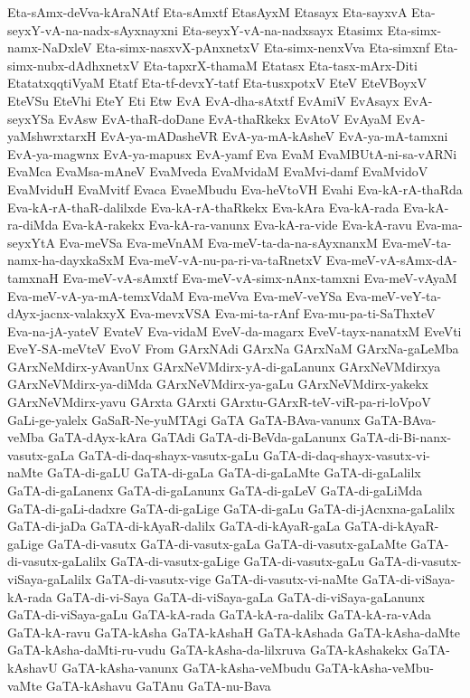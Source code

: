 {Eta-sAmx-deVva-kAraNAtf
Eta-sAmxtf
EtasAyxM
Etasayx
Eta-sayxvA
Eta-seyxY-vA-na-nadx-sAyxnayxni
Eta-seyxY-vA-na-nadxsayx
Etasimx
Eta-simx-namx-NaDxleV
Eta-simx-nasxvX-pAnxnetxV
Eta-simx-nenxVva
Eta-simxnf
Eta-simx-nubx-dAdhxnetxV
Eta-tapxrX-thamaM
Etatasx
Eta-tasx-mArx-Diti
EtatatxqqtiVyaM
Etatf
Eta-tf-devxY-tatf
Eta-tusxpotxV
EteV
EteVBoyxV
EteVSu
EteVhi
EteY
Eti
Etw
EvA
EvA-dha-sAtxtf
EvAmiV
EvAsayx
EvA-seyxYSa
EvAsw
EvA-thaR-doDane
EvA-thaRkekx
EvAtoV
EvAyaM
EvA-yaMshwrxtarxH
EvA-ya-mADasheVR
EvA-ya-mA-kAsheV
EvA-ya-mA-tamxni
EvA-ya-magwnx
EvA-ya-mapusx
EvA-yamf
Eva
EvaM
EvaMBUtA-ni-sa-vARNi
EvaMca
EvaMsa-mAneV
EvaMveda
EvaMvidaM
EvaMvi-damf
EvaMvidoV
EvaMviduH
EvaMvitf
Evaca
EvaeMbudu
Eva-heVtoVH
Evahi
Eva-kA-rA-thaRda
Eva-kA-rA-thaR-dalilxde
Eva-kA-rA-thaRkekx
Eva-kAra
Eva-kA-rada
Eva-kA-ra-diMda
Eva-kA-rakekx
Eva-kA-ra-vanunx
Eva-kA-ra-vide
Eva-kA-ravu
Eva-ma-seyxYtA
Eva-meVSa
Eva-meVnAM
Eva-meV-ta-da-na-sAyxnanxM
Eva-meV-ta-namx-ha-dayxkaSxM
Eva-meV-vA-nu-pa-ri-va-taRnetxV
Eva-meV-vA-sAmx-dA-tamxnaH
Eva-meV-vA-sAmxtf
Eva-meV-vA-simx-nAnx-tamxni
Eva-meV-vAyaM
Eva-meV-vA-ya-mA-temxVdaM
Eva-meVva
Eva-meV-veYSa
Eva-meV-veY-ta-dAyx-jacnx-valakxyX
Eva-mevxVSA
Eva-mi-ta-rAnf
Eva-mu-pa-ti-SaThxteV
Eva-na-jA-yateV
EvateV
Eva-vidaM
EveV-da-magarx
EveV-tayx-nanatxM
EveVti
EveY-SA-meVteV
EvoV
From
GArxNAdi
GArxNa
GArxNaM
GArxNa-gaLeMba
GArxNeMdirx-yAvanUnx
GArxNeVMdirx-yA-di-gaLanunx
GArxNeVMdirxya
GArxNeVMdirx-ya-diMda
GArxNeVMdirx-ya-gaLu
GArxNeVMdirx-yakekx
GArxNeVMdirx-yavu
GArxta
GArxti
GArxtu-GArxR-teV-viR-pa-ri-loVpoV
GaLi-ge-yalelx
GaSaR-Ne-yuMTAgi
GaTA
GaTA-BAva-vanunx
GaTA-BAva-veMba
GaTA-dAyx-kAra
GaTAdi
GaTA-di-BeVda-gaLanunx
GaTA-di-Bi-nanx-vasutx-gaLa
GaTA-di-daq-shayx-vasutx-gaLu
GaTA-di-daq-shayx-vasutx-vi-naMte
GaTA-di-gaLU
GaTA-di-gaLa
GaTA-di-gaLaMte
GaTA-di-gaLalilx
GaTA-di-gaLanenx
GaTA-di-gaLanunx
GaTA-di-gaLeV
GaTA-di-gaLiMda
GaTA-di-gaLi-dadxre
GaTA-di-gaLige
GaTA-di-gaLu
GaTA-di-jAcnxna-gaLalilx
GaTA-di-jaDa
GaTA-di-kAyaR-dalilx
GaTA-di-kAyaR-gaLa
GaTA-di-kAyaR-gaLige
GaTA-di-vasutx
GaTA-di-vasutx-gaLa
GaTA-di-vasutx-gaLaMte
GaTA-di-vasutx-gaLalilx
GaTA-di-vasutx-gaLige
GaTA-di-vasutx-gaLu
GaTA-di-vasutx-viSaya-gaLalilx
GaTA-di-vasutx-vige
GaTA-di-vasutx-vi-naMte
GaTA-di-viSaya-kA-rada
GaTA-di-vi-Saya
GaTA-di-viSaya-gaLa
GaTA-di-viSaya-gaLanunx
GaTA-di-viSaya-gaLu
GaTA-kA-rada
GaTA-kA-ra-dalilx
GaTA-kA-ra-vAda
GaTA-kA-ravu
GaTA-kAsha
GaTA-kAshaH
GaTA-kAshada
GaTA-kAsha-daMte
GaTA-kAsha-daMti-ru-vudu
GaTA-kAsha-da-lilxruva
GaTA-kAshakekx
GaTA-kAshavU
GaTA-kAsha-vanunx
GaTA-kAsha-veMbudu
GaTA-kAsha-veMbu-vaMte
GaTA-kAshavu
GaTAnu
GaTA-nu-Bava
}

